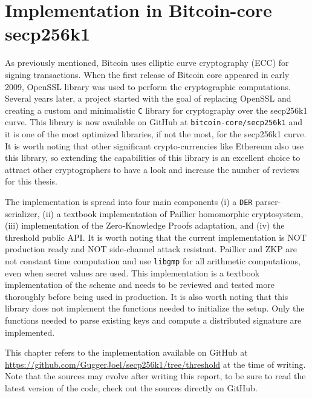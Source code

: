 \chapter{Implementation in Bitcoin-core secp256k1}
\label{chap:implementation-secp256k1}

As previously mentioned, Bitcoin uses elliptic curve cryptography (ECC) for signing
transactions. When the first release of Bitcoin core appeared in early 2009,
OpenSSL library was used to perform the cryptographic computations.  Several years
later, a project started with the goal of replacing OpenSSL and creating a custom
and minimalistic \texttt{C} library for cryptography over the secp256k1 curve.
This library is now available on GitHub at \texttt{bitcoin-core/secp256k1}
and it is one of the most optimized libraries, if not the most,
for the secp256k1 curve. It is worth noting that other significant
crypto-currencies like Ethereum also use this library, so extending the
capabilities of this library is an excellent choice to attract other
cryptographers to have a look and increase the number of reviews for this
thesis.

The implementation is spread into four main components (i) a \texttt{DER}
parser-serializer, (ii) a textbook implementation of Paillier homomorphic
cryptosystem, (iii) implementation of the Zero-Knowledge Proofs adaptation, and
(iv) the threshold public API. It is worth noting that the current
implementation is NOT production ready and NOT side-channel attack resistant.
Paillier and ZKP are not constant time computation and use \texttt{libgmp} for
all arithmetic computations, even when secret values are used. This
implementation is a textbook implementation of the scheme and needs to be
reviewed and tested more thoroughly before being used in production. It is also worth
noting that this library does not implement the functions needed to initialize
the setup. Only the functions needed to parse existing keys and compute a
distributed signature are implemented.

This chapter refers to the implementation available on GitHub at
\url{https://github.com/GuggerJoel/secp256k1/tree/threshold} at the time of writing. Note that the sources may evolve after writing this report, to be sure to read the latest version of the code, check out the sources directly on GitHub.

\minitoc

\newpage

